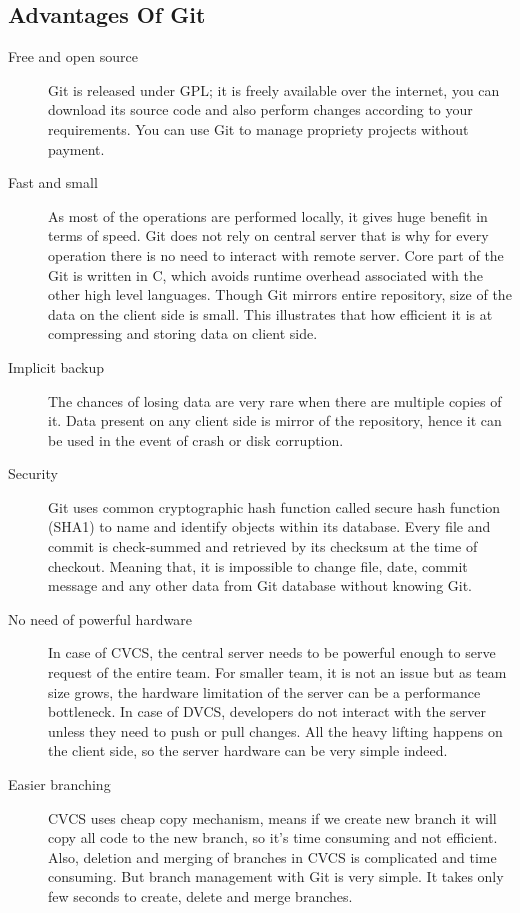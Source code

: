 \documentclass[11pt,a4paper]{article}
\begin{document}
\subsection*{Advantages Of Git}
\begin{description}
\item[Free and open source] Git is released under GPL; it is freely available over the internet, you can download its source code and also perform changes according to your requirements. You can use Git to manage propriety projects without payment.
\item[Fast and small] As most of the operations are performed locally, it gives huge benefit in terms of speed. Git does not rely on central server that is why for every operation there is no need to interact with remote server. Core part of the Git is written in C, which avoids runtime overhead associated with the other high level languages. Though Git mirrors entire repository, size of the data on the client side is small. This illustrates that how efficient it is at compressing and storing data on client side.

\item[Implicit backup] The chances of losing data are very rare when there are multiple copies of it. Data present on any client side is mirror of the repository, hence it can be used in the event of crash or disk corruption.
\item[Security] Git uses common cryptographic hash function called secure hash function (SHA1) to name and identify objects within its database. Every file and commit is check-summed and retrieved by its checksum at the time of checkout. Meaning that, it is impossible to change file, date, commit message and any other data from Git database without knowing Git.

\item[No need of powerful hardware] In case of CVCS, the central server needs to be powerful enough to serve request of the entire team. For smaller team, it is not an issue but as team size grows, the hardware limitation of the server can be a performance bottleneck. In case of DVCS, developers do not interact with the server unless they need to push or pull changes. All the heavy lifting happens on the client side, so the server hardware can be very simple indeed.

\item[Easier branching] CVCS uses cheap copy mechanism, means if we create new branch it will copy all code to the new branch, so it's time consuming and not efficient. Also, deletion and merging of branches in CVCS is complicated and time consuming. But branch management with Git is very simple. It takes only few seconds to create, delete and merge branches.
\end{description}
\end{document}

